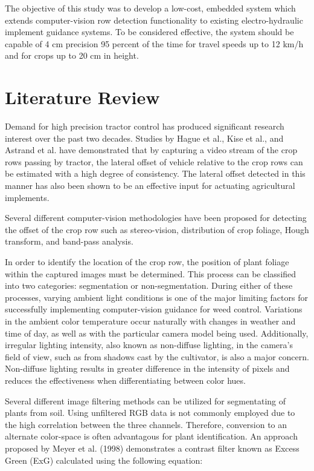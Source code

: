 \documentclass[authoryear]{elsarticle}
\begin{document}
The objective of this study was to develop a low-cost, embedded system
which extends computer-vision row detection functionality to existing
electro-hydraulic implement guidance systems.  To be considered
effective, the system should be capable of 4 cm precision 95 percent of the 
time for travel speeds up to 12 km/h and for crops up to 20 cm in
height.

\section{Literature Review}
Demand for high precision tractor control has produced significant
research interest over the past two decades. Studies by Hague et
al., Kise et al., and Astrand et al. have demonstrated that by 
capturing a video stream of the crop rows passing by tractor, the 
lateral offset of vehicle relative to the crop rows can be estimated
with a high degree of consistency. The lateral offset detected in this manner
has also been shown to be an effective input for actuating agricultural 
implements.

Several different computer-vision methodologies have been proposed for 
detecting the offset of the crop row such as stereo-vision, distribution
of crop foliage, Hough transform, and band-pass analysis.

In order to identify the location of the crop row, the position of
plant foliage within the captured images must be determined. This
process can be classified into two categories: segmentation or
non-segmentation. During either of these processes, varying ambient light
conditions is one of the major limiting factors for successfully
implementing computer-vision guidance for weed control. Variations in
the ambient color temperature occur naturally with changes in weather
and time of day, as well as with the particular camera model being
used. Additionally, irregular lighting intensity, also known as
non-diffuse lighting, in the camera’s field of view, such as from
shadows cast by the cultivator, is also a major concern. Non-diffuse
lighting results in greater difference in the intensity of pixels and
reduces the effectiveness when differentiating between color hues.
 
Several different image filtering methods can be utilized for
segmentating of plants from soil. Using unfiltered RGB data is not
commonly employed due to the high correlation between the three
channels. Therefore, conversion to an alternate color-space is often
advantagous for plant identification. An approach proposed by Meyer et
al. (1998) demonstrates a contrast filter known as Excess Green (ExG)
calculated using the following equation:
\end{document}
